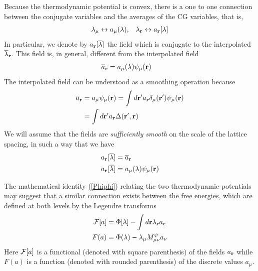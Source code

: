 \documentclass[b5paper,openright,10pt]{book}
\begin{document}
\begin{appendices}
Because the thermodynamic potential is convex, there is a one to one connection between
the conjugate variables and the averages of the CG variables, that is,
\begin{align}
  \lambda_\mu \leftrightarrow a_\mu(\lambda), &&
  \lambda_{\bf r} \leftrightarrow a_{\bf r}[\lambda]
\end{align}
In particular, we denote by $a_{\bf r}[\overline{\lambda}]  $ the field which is
conjugate to the interpolated $\overline{\lambda}_{\bf r}$.
This field is, in general, different from the interpolated field
\begin{align}
  \overline{a}_{\bf r}&=a_\mu(\lambda)\psi_\mu({\bf r})
\end{align}
The interpolated field can be understood as a smoothing operation because
\begin{align}
  \overline{a}_{\bf r}&=a_\mu\psi_\mu({\bf r})
=\int d{\bf r}'a_{\bf r}\delta_\mu({\bf r}')\psi_\mu({\bf r})
\nonumber\\
&=\int d{\bf r}'a_{\bf r}\Delta({\bf r}',{\bf r})
\end{align}
 We will assume that the fields are \textit{sufficiently smooth}
on the scale of the lattice spacing, in such a way that we have
\begin{align}
  a_{\bf r}[\overline{\lambda}] &=  \overline{a}_{\bf r}
\nonumber\\
  a_{\bf r}[\overline{\lambda}] &= a_\mu(\lambda)\psi_\mu({\bf r})
\label{smooth}
\end{align}


The   mathematical   identity    (\ref{Phiphi})   relating   the   two
thermodynamic potentials may suggest  that a similar connection exists
between the  free energies, which  are defined  at both levels  by the
Legendre transforms
\begin{align}
  {\cal F}[a]&=\Phi[\lambda]-\int d{\bf r}\lambda_{\bf r}a_{\bf r}
\nonumber\\
F(a)&=\Phi(\lambda)- \lambda_\mu M^\psi_{\mu\nu}a_\nu
\label{FF0}
\end{align}
Here ${\cal F}[a]$  is a functional (denoted  with square parenthesis)
of the  fields $a_{\bf r}$  while $F(a)$  is a function  (denoted with
rounded parenthesis)  of the discrete values  $a_\mu$. 


\end{appendices}
\end{document}
